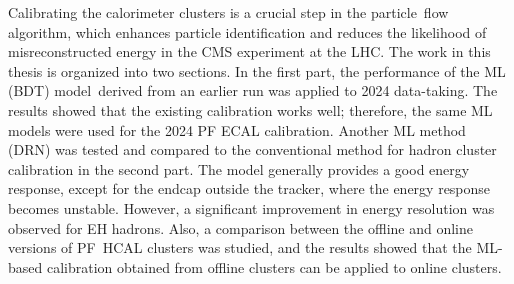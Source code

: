 Calibrating the calorimeter clusters is a crucial step in the particle flow algorithm, which enhances particle identification and reduces the likelihood of misreconstructed energy in the CMS experiment at the LHC.
The work in this thesis is organized into two sections.
In the first part, the performance of the ML (BDT) model derived from an earlier run was applied to 2024 data-taking.
The results showed that the existing calibration works well; therefore, the same ML models were used for the 2024 PF ECAL calibration.
Another ML method (DRN) was tested and compared to the conventional method for hadron cluster calibration in the second part.
The model generally provides a good energy response, except for the endcap outside the tracker, where the energy response becomes unstable.
However, a significant improvement in energy resolution was observed for EH hadrons.
Also, a comparison between the offline and online versions of PF HCAL clusters was studied, and the results showed that the ML-based calibration obtained from offline clusters can be applied to online clusters.












